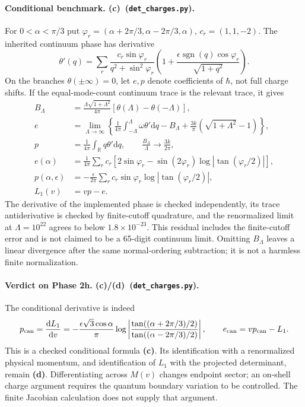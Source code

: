 \documentclass[11pt,a4paper]{article}
\newcommand{\Lc}{\textbf{(c)}}
\newcommand{\Ld}{\textbf{(d)}}
\newcommand{\Ccheck}{\texttt{det\_charges.py}}
\newcommand{\dd}{\mathrm d}
\newcommand{\R}{\mathbb R}
\begin{document}
\paragraph{Conditional benchmark. \Lc\ (\Ccheck).}
For $0<\alpha<\pi/3$ put $\varphi_r=(\alpha+2\pi/3,\alpha-2\pi/3,\alpha)$,
$c_r=(1,1,-2)$. The inherited continuum phase has derivative
\begin{equation}
 \theta'(q)=\sum_r\frac{c_r\sin\varphi_r}{q^2+\sin^2\varphi_r}
 \left(1+\frac{\epsilon\operatorname{sgn}(q)\cos\varphi_r}{\sqrt{1+q^2}}\right).
\end{equation}
On the branches $\theta(\pm\infty)=0$, let $e,p$ denote coefficients of
$\hbar$, not full charge shifts. If the equal-mode-count continuum trace is
the relevant trace, it gives
\begin{align}
 B_\Lambda&=\frac{\Lambda\sqrt{1+\Lambda^2}}{4\pi}
                      [\theta(\Lambda)-\theta(-\Lambda)],\\
 e&=\lim_{\Lambda\to\infty}\left\{
 \frac1{4\pi}\int_{-\Lambda}^{\Lambda}\omega\theta'\dd q-B_\Lambda
             +\frac{3k}{\pi}(\sqrt{1+\Lambda^2}-1)\right\},\\
 p&=\frac1{4\pi}\int_\R q\theta'\dd q,\qquad
 \frac{B_\Lambda}{\Lambda}\longrightarrow\frac{3k}{2\pi},\\
 e(\alpha)&=\frac1{4\pi}\sum_r c_r
       [2\sin\varphi_r-\sin(2\varphi_r)\log|\tan(\varphi_r/2)|],\\
 p(\alpha,\epsilon)&=-\frac\epsilon{2\pi}\sum_r c_r\sin\varphi_r
                                         \log|\tan(\varphi_r/2)|,\label{eq:mode}\\
 L_1(v)&=vp-e.
\end{align}
The derivative of the implemented phase is checked independently, its trace
antiderivative is checked by finite-cutoff quadrature, and the renormalized
limit at $\Lambda=10^{22}$ agrees to below $1.8\times10^{-23}$. This residual
includes the finite-cutoff error and is not claimed to be a 65-digit continuum
limit. Omitting $B_\Lambda$ leaves a linear divergence after the same
normal-ordering subtraction; it is not a harmless finite normalization.

\paragraph{Verdict on Phase 2h. \Lc/\Ld\ (\Ccheck).}
The conditional derivative is indeed
\begin{equation}
 p_{\rm can}=\frac{\dd L_1}{\dd v}
 =-\frac{\epsilon\sqrt3\cos\alpha}{\pi}
 \log\left|\frac{\tan((\alpha+2\pi/3)/2)}{\tan((\alpha-2\pi/3)/2)}\right|,
 \qquad e_{\rm can}=vp_{\rm can}-L_1.\label{eq:canonical}
\end{equation}
This is a checked conditional formula \Lc. Its identification with a
renormalized physical momentum, and identification of $L_1$ with the projected
determinant, remain \Ld. Differentiating across $M(v)$ changes endpoint sector;
an on-shell charge argument requires the quantum boundary variation to be
controlled. The finite Jacobian calculation does not supply that argument.
\end{document}
